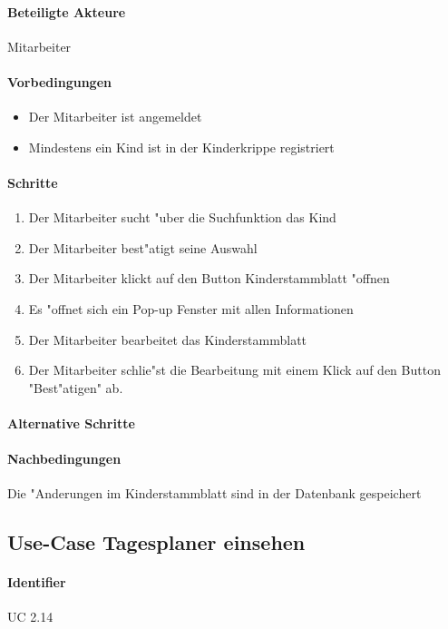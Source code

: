   \paragraph{Beteiligte Akteure}   \leavevmode \newline
  Mitarbeiter
  \paragraph{Vorbedingungen}
  \begin{itemize}
  	\item Der Mitarbeiter ist angemeldet
  	\item Mindestens ein Kind ist in der Kinderkrippe registriert
  \end{itemize}
  
  \paragraph{Schritte}
  \begin{enumerate}
  	\item Der Mitarbeiter sucht "uber die Suchfunktion das Kind
  	\item Der Mitarbeiter best"atigt seine Auswahl
  	\item Der Mitarbeiter klickt auf den Button \dq Kinderstammblatt "offnen\dq
  	\item Es "offnet sich ein Pop-up Fenster mit allen Informationen
  	\item Der Mitarbeiter bearbeitet das Kinderstammblatt
  	\item Der Mitarbeiter schlie"st die Bearbeitung mit einem Klick auf den Button "Best"atigen" ab. 
  \end{enumerate}
  
  \paragraph{Alternative Schritte}
  \paragraph{Nachbedingungen}
  Die "Anderungen im Kinderstammblatt sind in der Datenbank gespeichert
  
  
  \newpage
 \subsection{Use-Case Tagesplaner einsehen}
  \paragraph{Identifier}
  UC 2.14
